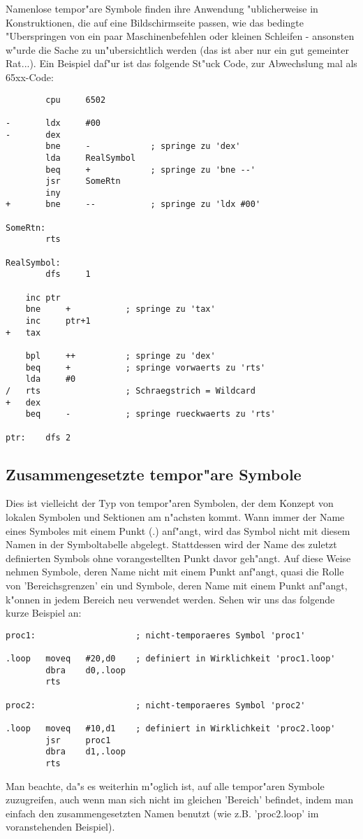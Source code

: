 \documentclass[12pt,a4paper,twoside]{report}
\begin{document}
Namenlose tempor"are Symbole finden ihre Anwendung "ublicherweise in
Konstruktionen, die auf eine Bildschirmseite passen, wie das bedingte
"Uberspringen von ein paar Maschinenbefehlen oder kleinen Schleifen -
ansonsten w"urde die Sache zu un"ubersichtlich werden (das ist aber nur
ein gut gemeinter Rat...).  Ein Beispiel daf"ur ist das folgende St"uck
Code, zur Abwechslung mal als 65xx-Code:
\begin{verbatim}
        cpu     6502

-       ldx     #00
-       dex
        bne     -            ; springe zu 'dex'
        lda     RealSymbol
        beq     +            ; springe zu 'bne --'
        jsr     SomeRtn
        iny
+       bne     --           ; springe zu 'ldx #00'

SomeRtn:
        rts

RealSymbol:
        dfs     1

  	inc	ptr
   	bne 	+      	    ; springe zu 'tax'
   	inc 	ptr+1
+ 	tax

 	bpl 	++     	    ; springe zu 'dex'
   	beq 	+      	    ; springe vorwaerts zu 'rts'
   	lda 	#0
/  	rts            	    ; Schraegstrich = Wildcard
+ 	dex
   	beq 	-           ; springe rueckwaerts zu 'rts'

ptr:	dfs	2
\end{verbatim}

\subsection{Zusammengesetzte tempor"are Symbole}

Dies ist vielleicht der Typ von tempor"aren Symbolen, der dem Konzept von
lokalen Symbolen und Sektionen am n"achsten kommt.  Wann immer der Name
eines Symboles mit einem Punkt (.) anf"angt, wird das Symbol nicht mit
diesem Namen in der Symboltabelle abgelegt.  Stattdessen wird der Name des
zuletzt definierten Symbols ohne vorangestellten Punkt davor geh"angt.  Auf
diese Weise nehmen Symbole, deren Name nicht mit einem Punkt anf"angt, quasi
die Rolle von 'Bereichsgrenzen' ein und Symbole, deren Name mit einem
Punkt anf"angt, k"onnen in jedem Bereich neu verwendet werden.  Sehen wir
uns das folgende kurze Beispiel an:
\begin{verbatim}
proc1:                    ; nicht-temporaeres Symbol 'proc1'

.loop   moveq   #20,d0    ; definiert in Wirklichkeit 'proc1.loop'
        dbra    d0,.loop
        rts

proc2:                    ; nicht-temporaeres Symbol 'proc2'

.loop   moveq   #10,d1    ; definiert in Wirklichkeit 'proc2.loop'
        jsr     proc1
        dbra    d1,.loop
        rts
\end{verbatim}
Man beachte, da"s es weiterhin m"oglich ist, auf alle tempor"aren Symbole
zuzugreifen, auch wenn man sich nicht im gleichen 'Bereich' befindet,
indem man einfach den zusammengesetzten Namen benutzt (wie z.B.
'proc2.loop' im voranstehenden Beispiel).
\end{document}
